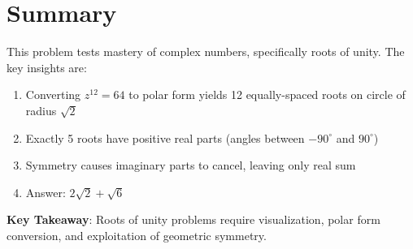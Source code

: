 \documentclass[11pt]{article}
\begin{document}
\section*{Summary}

This problem tests mastery of complex numbers, specifically roots of unity. The key insights are:
\begin{enumerate}
    \item Converting $z^{12}=64$ to polar form yields 12 equally-spaced roots on circle of radius $\sqrt{2}$
    \item Exactly 5 roots have positive real parts (angles between $-90^\circ$ and $90^\circ$)
    \item Symmetry causes imaginary parts to cancel, leaving only real sum
    \item Answer: $\boxed{2\sqrt{2} + \sqrt{6}}$
\end{enumerate}

\textbf{Key Takeaway}: Roots of unity problems require visualization, polar form conversion, and exploitation of geometric symmetry.
\end{document}

